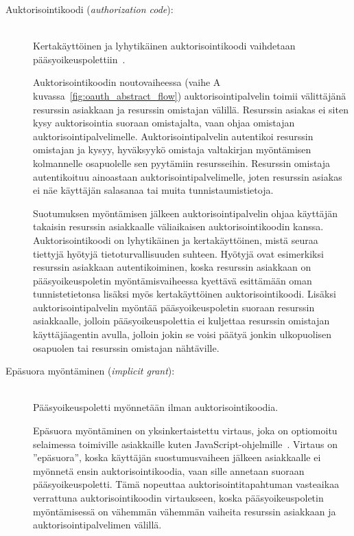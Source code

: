 \documentclass[finnish,gradu]{tktltiki}
\begin{document}
  \begin{description}
  \item[Auktorisointikoodi (\emph{authorization code}):] \hfill \\
  Kertakäyttöinen ja lyhytikäinen auktorisointikoodi vaihdetaan pääsyoikeuspolettiin~\cite{ietf_oauth2}.

  Auktorisointikoodin noutovaiheessa (vaihe A kuvassa~\ref{fig:oauth_abstract_flow}) auktorisointipalvelin toimii välittäjänä resurssin asiakkaan ja resurssin omistajan välillä. Resurssin asiakas ei siten kysy auktorisointia suoraan omistajalta, vaan ohjaa omistajan auktorisointipalvelimelle. Auktorisointipalvelin autentikoi resurssin omistajan ja kysyy, hyväksyykö omistaja valtakirjan myöntämisen kolmannelle osapuolelle sen pyytämiin resursseihin. Resurssin omistaja autentikoituu ainoastaan auktorisointipalvelimelle, joten resurssin asiakas ei näe käyttäjän salasanaa tai muita tunnistaumistietoja.

  Suotumuksen myöntämisen jälkeen auktorisointipalvelin ohjaa käyttäjän takaisin resurssin asiakkaalle väliaikaisen auktorisointikoodin kanssa. Auktorisointikoodi on lyhytikäinen ja kertakäyttöinen, mistä seuraa tiettyjä hyötyjä tietoturvallisuuden suhteen. Hyötyjä ovat esimerkiksi resurssin asiakkaan autentikoiminen, koska resurssin asiakkaan on pääsyoikeuspoletin myöntämisvaiheessa kyettävä esittämään oman tunnistetietonsa lisäksi myös kertakäyttöinen auktorisointikoodi. Lisäksi auktorisointipalvelin myöntää pääsyoikeuspoletin suoraan resurssin asiakkaalle, jolloin pääsyoikeuspolettia ei kuljettaa resurssin omistajan käyttäjäagentin avulla, jolloin jokin se voisi päätyä jonkin ulkopuolisen osapuolen tai resurssin omistajan nähtäville.

  \item[Epäsuora myöntäminen (\emph{implicit grant}):] \hfill \\
  Pääsyoikeuspoletti myönnetään ilman auktorisointikoodia.

  Epäsuora myöntäminen on yksinkertaistettu virtaus, joka on optiomoitu selaimessa toimiville asiakkaille kuten JavaScript-ohjelmille~\cite{ietf_oauth2}. Virtaus on ''epäsuora'', koska käyttäjän suostumusvaiheen jälkeen asiakkaalle ei myönnetä ensin auktorisointikoodia, vaan sille annetaan suoraan pääsyoikeuspoletti. Tämä nopeuttaa auktorisointitapahtuman vasteaikaa verrattuna auktorisointikoodin virtaukseen, koska pääsyoikeuspoletin myöntämisessä on vähemmän vähemmän vaiheita resurssin asiakkaan ja auktorisointipalvelimen välillä.


\end{description}
\end{document}
